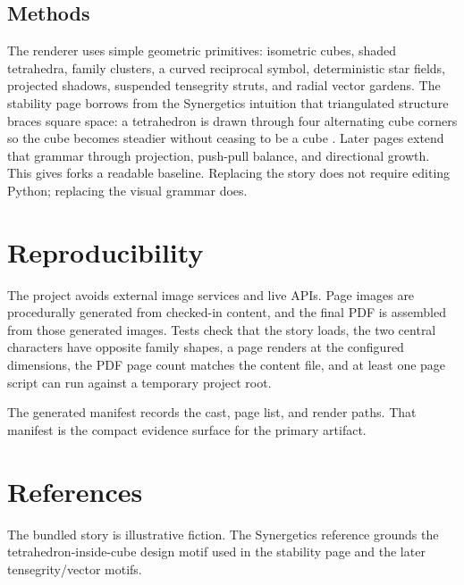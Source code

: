 \documentclass[
  english,
]{article}
\begin{document}
\subsection{Methods}\label{methods}

The renderer uses simple geometric primitives: isometric cubes, shaded
tetrahedra, family clusters, a curved reciprocal symbol, deterministic
star fields, projected shadows, suspended tensegrity struts, and radial
vector gardens. The stability page borrows from the Synergetics
intuition that triangulated structure braces square space: a tetrahedron
is drawn through four alternating cube corners so the cube becomes
steadier without ceasing to be a cube \citep{fuller1975synergetics}.
Later pages extend that grammar through projection, push-pull balance,
and directional growth. This gives forks a readable baseline. Replacing
the story does not require editing Python; replacing the visual grammar
does.

\newpage

\section{Reproducibility}\label{reproducibility}

The project avoids external image services and live APIs. Page images
are procedurally generated from checked-in content, and the final PDF is
assembled from those generated images. Tests check that the story loads,
the two central characters have opposite family shapes, a page renders
at the configured dimensions, the PDF page count matches the content
file, and at least one page script can run against a temporary project
root.

The generated manifest records the cast, page list, and render paths.
That manifest is the compact evidence surface for the primary artifact.

\newpage

\section{References}\label{references}

The bundled story is illustrative fiction. The Synergetics reference
grounds the tetrahedron-inside-cube design motif used in the stability
page and the later tensegrity/vector motifs.



\clearpage


\end{document}
